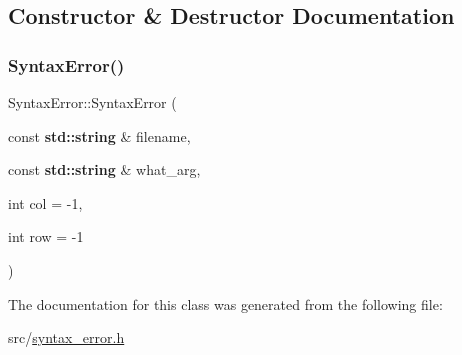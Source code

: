 \subsection{Constructor \& Destructor Documentation}
\mbox{\label{class_syntax_error_a16dc968369bcbe16544f01e53dfd97d0}} 
\subsubsection{\texorpdfstring{Syntax\+Error()}{SyntaxError()}}
{\footnotesize\ttfamily Syntax\+Error\+::\+Syntax\+Error (\begin{DoxyParamCaption}\item[{const \textbf{ std\+::string} \&}]{filename,  }\item[{const \textbf{ std\+::string} \&}]{what\+\_\+arg,  }\item[{int}]{col = {\ttfamily -\/1},  }\item[{int}]{row = {\ttfamily -\/1} }\end{DoxyParamCaption})\hspace{0.3cm}{\ttfamily [inline]}}



The documentation for this class was generated from the following file\+:\begin{DoxyCompactItemize}
\item 
src/\hyperlink{syntax__error_8h}{syntax\+\_\+error.\+h}\end{DoxyCompactItemize}
